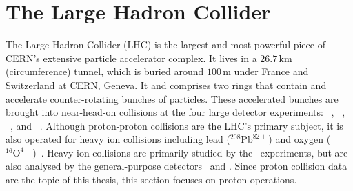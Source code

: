 \section{The Large Hadron Collider}
\label{sec:atlas_lhc}
The Large Hadron Collider (LHC) is the largest and most powerful piece of
CERN's extensive particle accelerator complex.
It lives in a $26.7\,\mathrm{km}$ (circumference) tunnel, which is buried
around $100\,\mathrm{m}$ under France and Switzerland at CERN, Geneva.
It and comprises two rings that contain and accelerate counter-rotating bunches
of particles.
These accelerated bunches are brought into near-head-on collisions at
the four large detector experiments:
\atlas~\cite{atlas2008experiment},
\lhcb~\cite{lhcb2008experiment},
\cms~\cite{cms2008experiment}, and
\alice~\cite{alice2008experiment}.
Although proton-proton collisions are the LHC's primary subject, it is also
operated for heavy ion collisions including lead ($^{208}\mathrm{Pb}^{82+}$)
and oxygen ($^{16}\mathrm{O}^{4+}$)~\cite{
Brewer:2021kiv,
lhc2008machine,
lhcDesignreport2004
}.
Heavy ion collisions are primarily studied by the \alice\ experiments, but are
also analysed by the general-purpose detectors \atlas\ and \cms.
Since proton collision data are the topic of this thesis, this section focuses
on proton operations.

